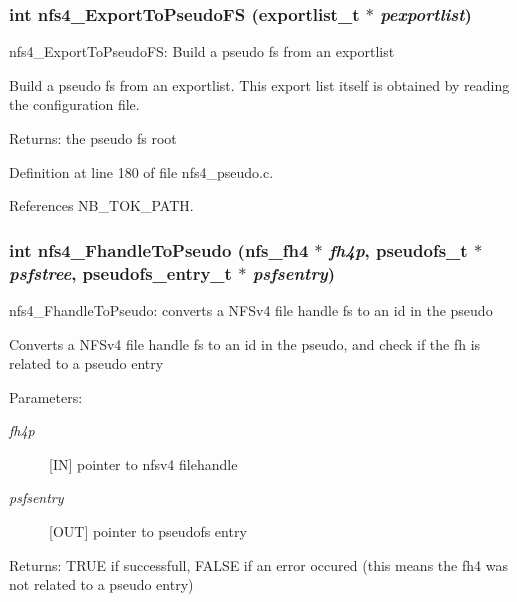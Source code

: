 \subsubsection{\setlength{\rightskip}{0pt plus 5cm}int nfs4\_\-Export\-To\-Pseudo\-FS (exportlist\_\-t $\ast$ {\em pexportlist})}\label{nfs4__pseudo_8c_a17}


nfs4\_\-Export\-To\-Pseudo\-FS: Build a pseudo fs from an exportlist

Build a pseudo fs from an exportlist. This export list itself is obtained by reading the configuration file.

\begin{Desc}
\item[Returns:]the pseudo fs root \end{Desc}


Definition at line 180 of file nfs4\_\-pseudo.c.

References NB\_\-TOK\_\-PATH.
\subsubsection{\setlength{\rightskip}{0pt plus 5cm}int nfs4\_\-Fhandle\-To\-Pseudo (nfs\_\-fh4 $\ast$ {\em fh4p}, pseudofs\_\-t $\ast$ {\em psfstree}, pseudofs\_\-entry\_\-t $\ast$ {\em psfsentry})}\label{nfs4__pseudo_8c_a19}


nfs4\_\-Fhandle\-To\-Pseudo: converts a NFSv4 file handle fs to an id in the pseudo

Converts a NFSv4 file handle fs to an id in the pseudo, and check if the fh is related to a pseudo entry

\begin{Desc}
\item[Parameters:]
\begin{description}
\item[{\em fh4p}][IN] pointer to nfsv4 filehandle \item[{\em psfsentry}][OUT] pointer to pseudofs entry\end{description}
\end{Desc}
\begin{Desc}
\item[Returns:]TRUE if successfull, FALSE if an error occured (this means the fh4 was not related to a pseudo entry) \end{Desc}


